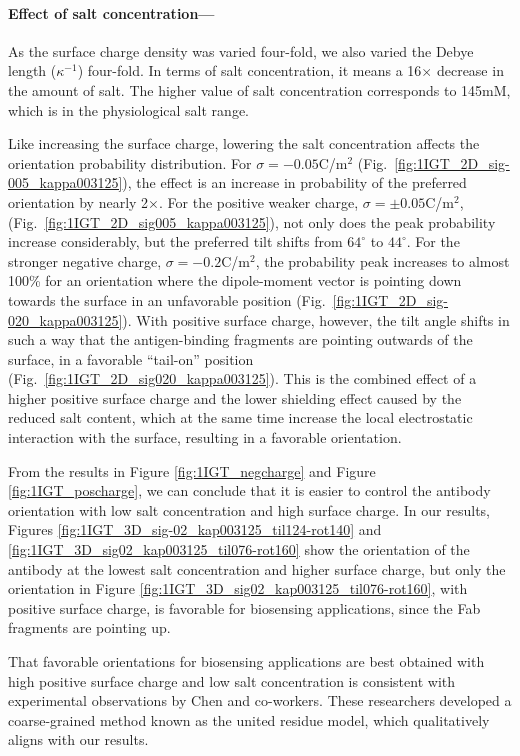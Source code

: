  \medskip
 
 \paragraph*{Effect of salt concentration---}
 
As the surface charge density was varied four-fold, we also varied the Debye length ($\kappa^{-1}$) four-fold. In terms of salt concentration, it means a 16$\times$ decrease in the amount of salt. The higher value of salt concentration corresponds to 145mM, which is in the physiological salt range.  
 
 Like increasing the surface charge, lowering the salt concentration affects the orientation probability distribution. For $\sigma=-0.05$C/m$^2$ (Fig.~\ref{fig:1IGT_2D_sig-005_kappa003125}), the effect is an increase in probability of the preferred orientation by nearly 2$\times$. For the positive weaker charge, $\sigma=\pm0.05$C/m$^2$, (Fig.~\ref{fig:1IGT_2D_sig005_kappa003125}), not only does the peak probability increase considerably, but the preferred tilt shifts from $64^{\circ}$ to $44^{\circ}$.
 For the stronger negative charge, $\sigma=-0.2$C/m$^2$, the probability peak increases to almost 100\% for an orientation where the dipole-moment vector is pointing down towards the surface in an unfavorable position (Fig.~\ref{fig:1IGT_2D_sig-020_kappa003125}).
 With positive surface charge, however, the tilt angle shifts in such a way that the antigen-binding fragments are pointing outwards of the surface, in a favorable ``tail-on'' position (Fig.~\ref{fig:1IGT_2D_sig020_kappa003125}). This is the combined effect of a higher positive surface charge and the lower shielding effect caused by the reduced salt content, which at the same time increase the local electrostatic interaction with the surface, resulting in a favorable orientation.

From the results in Figure \ref{fig:1IGT_negcharge} and Figure \ref{fig:1IGT_poscharge}, we can conclude that it is easier to control the antibody orientation with low salt concentration and high surface charge. 
In our results, Figures \ref{fig:1IGT_3D_sig-02_kap003125_til124-rot140} and \ref{fig:1IGT_3D_sig02_kap003125_til076-rot160} show the orientation of the antibody at the lowest salt concentration and higher surface charge, but only the orientation in Figure \ref{fig:1IGT_3D_sig02_kap003125_til076-rot160}, with positive surface charge, is favorable for biosensing applications, since the Fab fragments are pointing up.

That favorable orientations for biosensing applications are best obtained with high positive surface charge and low salt concentration is consistent with experimental observations by Chen and co-workers. \cite{ChenLiuZhouJiang2003} These researchers developed a coarse-grained method known as the united residue model,\cite{ZhouChenJiang2003} which qualitatively aligns with our results.
 

